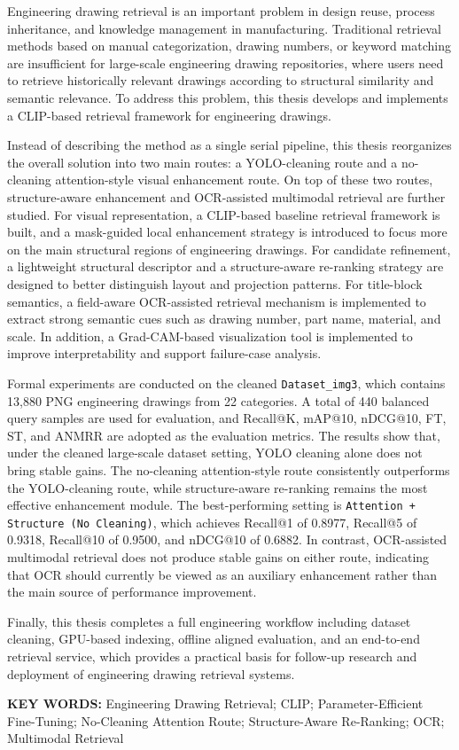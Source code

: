 Engineering drawing retrieval is an important problem in design reuse, process inheritance, and knowledge management in manufacturing. Traditional retrieval methods based on manual categorization, drawing numbers, or keyword matching are insufficient for large-scale engineering drawing repositories, where users need to retrieve historically relevant drawings according to structural similarity and semantic relevance. To address this problem, this thesis develops and implements a CLIP-based retrieval framework for engineering drawings.

Instead of describing the method as a single serial pipeline, this thesis reorganizes the overall solution into two main routes: a YOLO-cleaning route and a no-cleaning attention-style visual enhancement route. On top of these two routes, structure-aware enhancement and OCR-assisted multimodal retrieval are further studied. For visual representation, a CLIP-based baseline retrieval framework is built, and a mask-guided local enhancement strategy is introduced to focus more on the main structural regions of engineering drawings. For candidate refinement, a lightweight structural descriptor and a structure-aware re-ranking strategy are designed to better distinguish layout and projection patterns. For title-block semantics, a field-aware OCR-assisted retrieval mechanism is implemented to extract strong semantic cues such as drawing number, part name, material, and scale. In addition, a Grad-CAM-based visualization tool is implemented to improve interpretability and support failure-case analysis.

Formal experiments are conducted on the cleaned \texttt{Dataset\_img3}, which contains 13,880 PNG engineering drawings from 22 categories. A total of 440 balanced query samples are used for evaluation, and Recall@K, mAP@10, nDCG@10, FT, ST, and ANMRR are adopted as the evaluation metrics. The results show that, under the cleaned large-scale dataset setting, YOLO cleaning alone does not bring stable gains. The no-cleaning attention-style route consistently outperforms the YOLO-cleaning route, while structure-aware re-ranking remains the most effective enhancement module. The best-performing setting is \texttt{Attention + Structure (No Cleaning)}, which achieves Recall@1 of 0.8977, Recall@5 of 0.9318, Recall@10 of 0.9500, and nDCG@10 of 0.6882. In contrast, OCR-assisted multimodal retrieval does not produce stable gains on either route, indicating that OCR should currently be viewed as an auxiliary enhancement rather than the main source of performance improvement.

Finally, this thesis completes a full engineering workflow including dataset cleaning, GPU-based indexing, offline aligned evaluation, and an end-to-end retrieval service, which provides a practical basis for follow-up research and deployment of engineering drawing retrieval systems.

\noindent\textbf{KEY WORDS:} Engineering Drawing Retrieval; CLIP; Parameter-Efficient Fine-Tuning; No-Cleaning Attention Route; Structure-Aware Re-Ranking; OCR; Multimodal Retrieval
